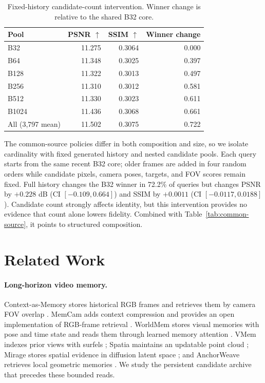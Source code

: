 \documentclass[10pt,twocolumn]{article}
\begin{document}
\begin{table}[!htbp]
\centering
\caption{Fixed-history candidate-count intervention. Winner change is relative
to the shared B32 core.}
\label{tab:fixed-pool}
\small
\begin{tabular}{lrrr}
\toprule
Pool & PSNR $\uparrow$ & SSIM $\uparrow$ & Winner change \\
\midrule
B32 & 11.275 & 0.3064 & 0.000 \\
B64 & 11.348 & 0.3025 & 0.397 \\
B128 & 11.322 & 0.3013 & 0.497 \\
B256 & 11.310 & 0.3012 & 0.581 \\
B512 & 11.330 & 0.3023 & 0.611 \\
B1024 & 11.436 & 0.3068 & 0.661 \\
All (3,797 mean) & 11.502 & 0.3075 & 0.722 \\
\bottomrule
\end{tabular}
\end{table}

The common-source policies differ in both composition and size, so we isolate
cardinality with fixed generated history and nested candidate pools. Each query
starts from the same recent B32 core; older frames are added in four random
orders while candidate pixels, camera poses, targets, and FOV scores remain
fixed. Full history changes the B32 winner in 72.2\% of queries but changes
PSNR by $+0.228$ dB (CI $[-0.109,0.664]$) and SSIM by $+0.0011$ (CI
$[-0.0117,0.0188]$). Candidate count strongly affects identity, but this
intervention provides no evidence that count alone lowers fidelity. Combined
with Table~\ref{tab:common-source}, it points to structured composition.

\section{Related Work}

\paragraph{Long-horizon video memory.}
Context-as-Memory stores historical RGB frames and retrieves them by camera FOV
overlap \citep{contextasmemory}. MemCam adds context compression and provides
an open implementation of RGB-frame retrieval \citep{memcam}. WorldMem stores
visual memories with pose and time state and reads them through learned memory
attention \citep{worldmem}. VMem indexes prior views with surfels
\citep{vmem}; Spatia maintains an updatable point cloud \citep{spatia}; Mirage
stores spatial evidence in diffusion latent space \citep{mirage}; and
AnchorWeave retrieves local geometric memories \citep{anchorweave}. We study
the persistent candidate archive that precedes these bounded reads.
\end{document}
